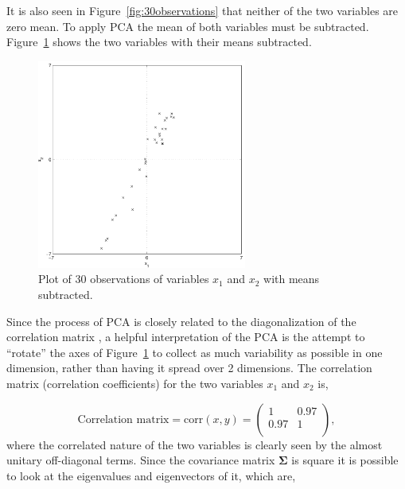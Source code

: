 It is also seen in Figure~\ref{fig:30observations} that neither of the two variables are zero mean. To apply PCA the mean of both variables must be subtracted. Figure~\ref{fig:30observationsBar} shows the two variables with their means subtracted.
\begin{figure}[!]
  \begin{center}
    \includegraphics[width=260px]{30observationsBar.pdf}
    \caption{Plot of 30 observations of variables $x_1$ and $x_2$ with means subtracted.}\label{fig:30observationsBar}
  \end{center}
\end{figure}

Since the process of PCA is closely related to the diagonalization of the correlation matrix \citep[p. 174]{Therrien1992}, a helpful interpretation of the PCA is the attempt to ``rotate'' the axes of Figure~\ref{fig:30observationsBar} to collect as much variability as possible in one dimension, rather than having it spread over 2 dimensions. The correlation matrix (correlation coefficients) for the two variables $x_1$ and $x_2$ is,

\begin{equation}\label{eq:corrcoef}
\textrm{Correlation matrix} = \textrm{corr}(x,y)= \left(
    \begin{array}{cc}
        1   & 0.97 \\
        0.97& 1    \\
    \end{array}\right),
\end{equation}
where the correlated nature of the two variables is clearly seen by the almost unitary off-diagonal terms. Since the covariance matrix $\boldsymbol\Sigma$ is square it is possible to look at the eigenvalues and eigenvectors of it, which are,

